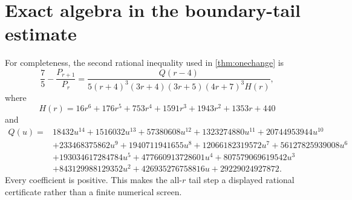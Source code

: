 \documentclass[11pt,a4paper]{article}
\begin{document}
\appendix
\section{Exact algebra in the boundary-tail estimate}\label{app:tailalgebra}

For completeness, the second rational inequality used in
\cref{thm:onechange} is
\[
 \frac75-\frac{P_{r+1}}{P_r}
 =\frac{Q(r-4)}
 {5(r+4)^3(3r+4)(3r+5)(4r+7)^3 H(r)},
\]
where
\[
 H(r)=16r^6+176r^5+753r^4+1591r^3+1943r^2+1353r+440
\]
and
\begin{align*}
Q(u)={}&18432u^{14}+1516032u^{13}+57380608u^{12}
 +1323274880u^{11}+20744953944u^{10}\\
&+233468375862u^9+1940711941655u^8+12066182319572u^7
 +56127825939008u^6\\
&+193034617284784u^5+477660913728601u^4
 +807579069619542u^3\\
&+843129988129352u^2+426935276758816u
 +29229024927872.
\end{align*}
Every coefficient is positive.  This makes the all-$r$ tail step a displayed
rational certificate rather than a finite numerical screen.

\printbibliography
\end{document}
